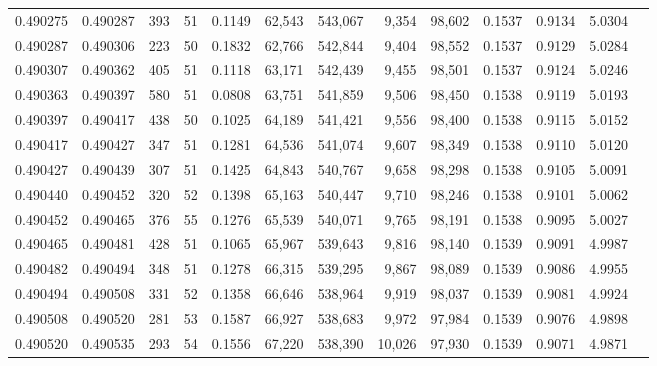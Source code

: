 \begin{tabular}{rrrrrrrrrrrrr}
0.490275 & 0.490287 & 393 &  51 &                                     0.1149 &  62,543 & 543,067 &   9,354 &  98,602 & 0.1537 & 0.9134 & 5.0304 \\
0.490287 & 0.490306 & 223 &  50 &                                     0.1832 &  62,766 & 542,844 &   9,404 &  98,552 & 0.1537 & 0.9129 & 5.0284 \\
0.490307 & 0.490362 & 405 &  51 &                                     0.1118 &  63,171 & 542,439 &   9,455 &  98,501 & 0.1537 & 0.9124 & 5.0246 \\
0.490363 & 0.490397 & 580 &  51 &                                     0.0808 &  63,751 & 541,859 &   9,506 &  98,450 & 0.1538 & 0.9119 & 5.0193 \\
0.490397 & 0.490417 & 438 &  50 &                                     0.1025 &  64,189 & 541,421 &   9,556 &  98,400 & 0.1538 & 0.9115 & 5.0152 \\
0.490417 & 0.490427 & 347 &  51 &                                     0.1281 &  64,536 & 541,074 &   9,607 &  98,349 & 0.1538 & 0.9110 & 5.0120 \\
0.490427 & 0.490439 & 307 &  51 &                                     0.1425 &  64,843 & 540,767 &   9,658 &  98,298 & 0.1538 & 0.9105 & 5.0091 \\
0.490440 & 0.490452 & 320 &  52 &                                     0.1398 &  65,163 & 540,447 &   9,710 &  98,246 & 0.1538 & 0.9101 & 5.0062 \\
0.490452 & 0.490465 & 376 &  55 &                                     0.1276 &  65,539 & 540,071 &   9,765 &  98,191 & 0.1538 & 0.9095 & 5.0027 \\
0.490465 & 0.490481 & 428 &  51 &                                     0.1065 &  65,967 & 539,643 &   9,816 &  98,140 & 0.1539 & 0.9091 & 4.9987 \\
0.490482 & 0.490494 & 348 &  51 &                                     0.1278 &  66,315 & 539,295 &   9,867 &  98,089 & 0.1539 & 0.9086 & 4.9955 \\
0.490494 & 0.490508 & 331 &  52 &                                     0.1358 &  66,646 & 538,964 &   9,919 &  98,037 & 0.1539 & 0.9081 & 4.9924 \\
0.490508 & 0.490520 & 281 &  53 &                                     0.1587 &  66,927 & 538,683 &   9,972 &  97,984 & 0.1539 & 0.9076 & 4.9898 \\
0.490520 & 0.490535 & 293 &  54 &                                     0.1556 &  67,220 & 538,390 &  10,026 &  97,930 & 0.1539 & 0.9071 & 4.9871 \\

\end{tabular}
